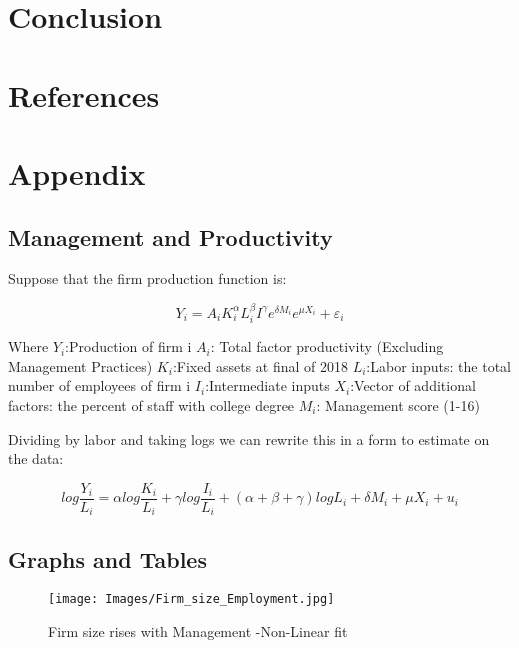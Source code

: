 \documentclass{article}
\begin{document}
\section{Conclusion}

\section{References}

\section{Appendix}

\subsection{Management and Productivity}

Suppose that the firm production function is:

$$Y_{i} = A_{i}K_{i}^{\alpha}L_{i}^{\beta}I^{\gamma}e^{\delta M_{i}}e^{\mu X_{i}} + \varepsilon_{i}$$

Where $Y_{i}$:Production of firm i
$A_{i}$: Total factor productivity (Excluding Management Practices)
$K_{i}$:Fixed assets at final of 2018
$L_{i}$:Labor inputs: the total number of employees of firm i
$I_{i}$:Intermediate inputs
$X_{i}$:Vector of additional factors: the percent of staff with college degree
$M_{i}$: Management score (1-16)

Dividing by labor and taking logs we can rewrite this in a form to estimate on the
data:

$$log\frac{Y_{i}}{L_{i}} = \alpha log\frac{K_{i}}{L_{i}} + \gamma log \frac{I_{i}}{L_{i}} + (\alpha+ \beta  +\gamma)log L_{i} +\delta M_{i} + \mu X_{i} + u_{i} $$


\subsection{Graphs and Tables}


\begin{figure}[htbp!]
    \caption{Firm size rises with Management -Non-Linear fit}
    \centering
    \texttt{[image: Images/Firm\_size\_Employment.jpg]}
\end{figure}
\end{document}
